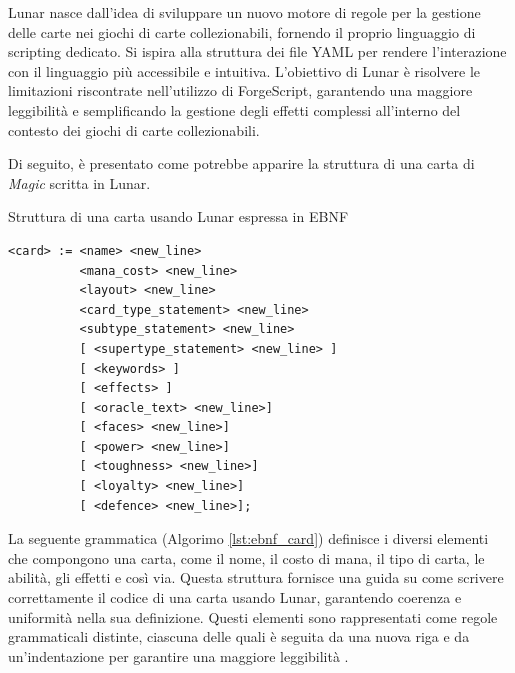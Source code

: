 Lunar nasce dall'idea di sviluppare un nuovo motore di regole per la gestione delle carte nei giochi di carte collezionabili, fornendo il proprio linguaggio di scripting dedicato. Si ispira alla struttura dei file YAML per rendere l'interazione con il linguaggio più accessibile e intuitiva. L'obiettivo di Lunar è risolvere le limitazioni riscontrate nell'utilizzo di ForgeScript, garantendo una maggiore leggibilità e semplificando la gestione degli effetti complessi all'interno del contesto dei giochi di carte collezionabili.


Di seguito, è presentato come potrebbe apparire la struttura di una carta  di \emph{Magic} scritta in Lunar.

\begin{algorithm}[ht]
	\caption{Struttura di una carta usando Lunar espressa in EBNF}
	\label{lst:ebnf_card}
	\begin{lstlisting}
<card> := <name> <new_line>
          <mana_cost> <new_line>
          <layout> <new_line> 
          <card_type_statement> <new_line> 
          <subtype_statement> <new_line>
          [ <supertype_statement> <new_line> ]
          [ <keywords> ]
          [ <effects> ]
          [ <oracle_text> <new_line>]
          [ <faces> <new_line>]
          [ <power> <new_line>]
          [ <toughness> <new_line>]
          [ <loyalty> <new_line>]
          [ <defence> <new_line>];
	\end{lstlisting}
\end{algorithm}
La seguente grammatica (Algorimo \ref{lst:ebnf_card}) definisce i diversi elementi che compongono una carta, come il nome, il costo di mana, il tipo di carta, le abilità, gli effetti e così via. Questa struttura fornisce una guida su come scrivere correttamente il codice di una carta usando Lunar, garantendo coerenza e uniformità nella sua definizione.
Questi elementi sono rappresentati come regole grammaticali distinte, ciascuna delle quali è seguita da una nuova riga e da un'indentazione per garantire una maggiore leggibilità .

